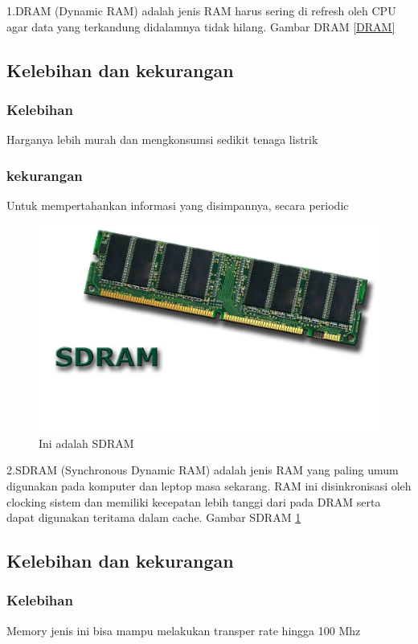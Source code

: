 1.DRAM (Dynamic RAM) adalah jenis RAM harus sering di refresh oleh CPU agar data yang terkandung didalamnya tidak hilang.
  Gambar DRAM \ref{DRAM}
  \subsection{Kelebihan dan kekurangan}
    \subsubsection{Kelebihan}
    \-Harganya lebih murah dan mengkonsumsi sedikit tenaga listrik
    \subsubsection{kekurangan}
    \-Untuk mempertahankan informasi yang disimpannya, secara periodic
    
  \begin{figure}[ht]
  \centerline{\includegraphics[width=1\textwidth]{figures/SDRAM.jpg}}
  \caption{Ini adalah SDRAM}
  \label{SDRAM}
  \end{figure}

2.SDRAM (Synchronous Dynamic RAM) adalah jenis RAM yang paling umum digunakan pada komputer dan leptop masa sekarang. RAM ini disinkronisasi oleh clocking sistem dan memiliki kecepatan lebih tanggi dari pada DRAM serta dapat digunakan teritama dalam cache.
Gambar SDRAM \ref{SDRAM}
    \subsection{Kelebihan dan kekurangan}
    \subsubsection{Kelebihan}
    \-Memory jenis ini bisa mampu melakukan transper rate hingga 100 Mhz
